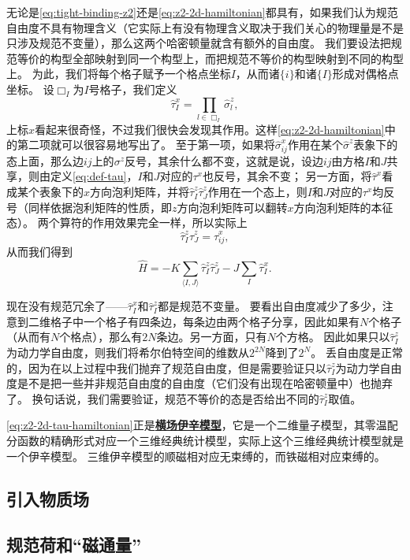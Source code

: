 \documentclass[hyperref, UTF8, a4paper]{ctexart}
\newcommand*{\pair}[1]{\langle #1 \rangle}
\newcommand*{\concept}[1]{\underline{\textbf{#1}}}
\newcommand*{\Ztwo}{$\mathbb{Z}_2$}
\begin{document}
无论是\eqref{eq:tight-binding-z2}还是\eqref{eq:z2-2d-hamiltonian}都具有，如果我们认为规范自由度不具有物理含义（它实际上有没有物理含义取决于我们关心的物理量是不是只涉及规范不变量），那么这两个哈密顿量就含有额外的自由度。
我们要设法把规范等价的构型全部映射到同一个构型上，而把规范不等价的构型映射到不同的构型上。
为此，我们将每个格子赋予一个格点坐标$I$，从而诸$\{i\}$和诸$\{I\}$形成对偶格点坐标。
设$\Box_I$为$I$号格子，我们定义
\begin{equation}
    \hat{\tau}^x_I = \prod_{l \in \Box_I} \hat{\sigma}^z_l,
    \label{eq:def-tau}
\end{equation}
上标$x$看起来很奇怪，不过我们很快会发现其作用。这样\eqref{eq:z2-2d-hamiltonian}中的第二项就可以很容易地写出了。
至于第一项，如果将$\hat{\sigma}_{ij}^x$作用在某个$\hat{\sigma}^z$表象下的态上面，那么边$ij$上的$\sigma^z$反号，其余什么都不变，这就是说，设边$ij$由方格$I$和$J$共享，则由定义\eqref{eq:def-tau}，$I$和$J$对应的$\tau^x$也反号，其余不变；
另一方面，将$\hat{\tau}^x$看成某个表象下的$x$方向泡利矩阵，并将$\hat{\tau}^z_I \hat{\tau}^z_J$作用在一个态上，则$I$和$J$对应的$\tau^x$均反号（同样依据泡利矩阵的性质，即$z$方向泡利矩阵可以翻转$x$方向泡利矩阵的本征态）。
两个算符的作用效果完全一样，所以实际上
\[
    \hat{\tau}^z_I \hat{\tau}^z_J = \hat{\tau}^x_{ij},
\]
从而我们得到
\begin{equation}
    \hat{H} = - K \sum_{\pair{I, J}} \hat{\tau}^z_I \hat{\tau}^z_J - J \sum_{I} \hat{\tau}^x_I.
    \label{eq:z2-2d-tau-hamiltonian}
\end{equation}

现在没有规范冗余了——$\hat{\tau}^x_{I}$和$\hat{\tau}^z_I$都是规范不变量。
要看出自由度减少了多少，注意到二维格子中一个格子有四条边，每条边由两个格子分享，因此如果有$N$个格子（从而有$N$个格点），那么有$2N$条边。另一方面，只有$N$个方格。
因此如果只以$\hat{\tau}^z_I$为动力学自由度，则我们将希尔伯特空间的维数从$2^{2N}$降到了$2^N$。
丢自由度是正常的，因为在以上过程中我们抛弃了规范自由度，但是需要验证只以$\hat{\tau}^z_I$为动力学自由度是不是把一些并非规范自由度的自由度（它们没有出现在哈密顿量中）也抛弃了。
换句话说，我们需要验证，规范不等价的态是否给出不同的$\hat{\tau}^z_I$取值。

\eqref{eq:z2-2d-tau-hamiltonian}正是\concept{横场伊辛模型}，它是一个二维量子模型，其零温配分函数的精确形式对应一个三维经典统计模型，实际上这个三维经典统计模型就是一个伊辛模型。
三维伊辛模型的顺磁相对应无束缚的，而铁磁相对应束缚的。

\subsection{引入物质场}



\subsection{规范荷和“磁通量”}
\end{document}

